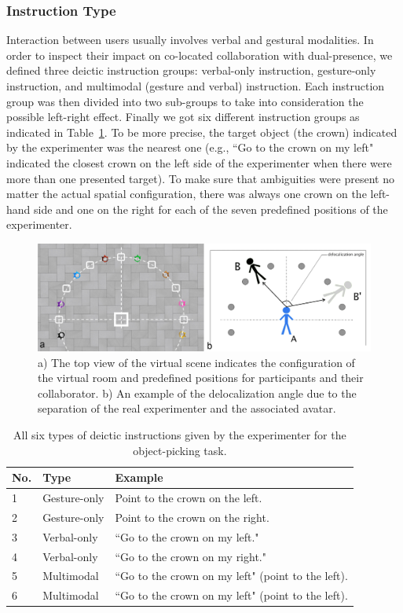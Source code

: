 \subsubsection{Instruction Type}
Interaction between users usually involves verbal and gestural modalities. In order to inspect their impact on co-located collaboration with dual-presence, we defined three deictic instruction groups: verbal-only instruction, gesture-only instruction, and multimodal (gesture and verbal) instruction. Each instruction group was then divided into two sub-groups to take into consideration the possible left-right effect. Finally we got six different instruction groups as indicated in Table~\ref{tab:3_instruction_type}. To be more precise, the target object (the crown) indicated by the experimenter was the nearest one (e.g., ``Go to the crown on my left" indicated the closest crown on the left side of the experimenter when there were more than one presented target). To make sure that ambiguities were present no matter the actual spatial configuration, there was always one crown on the left-hand side and one on the right for each of the seven predefined positions of the experimenter.

\begin{figure}[htb]
  \centering
  \includegraphics[width=\textwidth]{figures/ch3/floor}
  \caption{\label{fig:3_floor}a) The top view of the virtual scene indicates the configuration of the virtual room and predefined positions for participants and their collaborator. b) An example of the delocalization angle due to the separation of the real experimenter and the associated avatar.}
\end{figure}

\begin{table}[!t]
\renewcommand{\arraystretch}{1.3}
\caption{All six types of deictic instructions given by the experimenter for the object-picking task.}
\label{tab:3_instruction_type}
\centering
\begin{tabular}{l l l}
  \hline
  No. & Type & Example \\
  \hline
    1 & Gesture-only & Point to the crown on the left. \\
    2 & Gesture-only & Point to the crown on the right. \\
    3 & Verbal-only & ``Go to the crown on my left." \\
    4 & Verbal-only & ``Go to the crown on my right." \\
    5 & Multimodal & ``Go to the crown on my left" (point to the left). \\
    6 & Multimodal & ``Go to the crown on my left" (point to the left). \\ \hline
\end{tabular}
\end{table}

